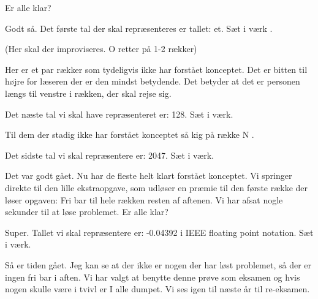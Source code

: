 \documentclass[a4paper,11pt]{article}
\begin{document}
\begin{sketch}
 Er alle klar?


 Godt så. Det første tal der skal repræsenteres er tallet: et. Sæt i 
værk . 

(Her skal der improviseres. O retter på 1-2 rækker) 

 Her er et par rækker som tydeligvis ikke har forstået konceptet. Det 
er bitten til højre for læseren der er den mindst betydende. Det betyder 
at det er personen længs til venstre i rækken, der skal rejse sig. 

 Det næste tal vi skal have repræsenteret er: 128. Sæt i værk. 

 Til dem der stadig ikke har forstået konceptet så kig på række N
. 

 Det sidste tal vi skal repræsentere er: 2047. Sæt i værk.


 Det var godt gået. Nu har de fleste helt klart forstået konceptet. Vi 
springer direkte til den lille ekstraopgave, som udløser en præmie til 
den første række der løser opgaven: Fri bar til hele rækken resten af 
aftenen. Vi har afsat nogle sekunder til at løse problemet. Er alle klar? 

 Super. Tallet vi skal repræsentere er: -0.04392 i IEEE floating point 
notation. Sæt i værk. 


 Så er tiden gået. Jeg kan se at der ikke er nogen der har løst 
problemet, så der er ingen fri bar i aften. Vi har valgt at benytte 
denne prøve som eksamen og hvis nogen skulle være i tvivl er I alle 
dumpet. Vi ses igen til næste år til re-eksamen.


\end{sketch}
\end{document}
